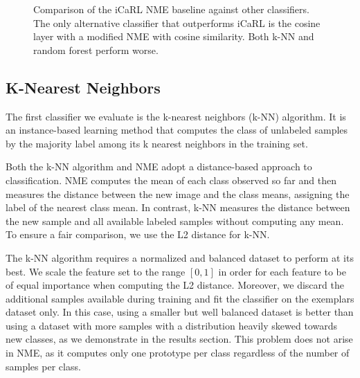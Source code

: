 \documentclass[10pt,twocolumn,letterpaper]{article}
\begin{document}
\begin{figure}
\caption{Comparison of the iCaRL NME baseline against other classifiers. The only alternative classifier that outperforms iCaRL is the cosine layer with a modified NME with cosine similarity. Both k-NN and random forest perform worse.}
\label{fig:classifier:plot}
\end{figure}

\subsection{K-Nearest Neighbors}
The first classifier we evaluate is the k-nearest neighbors (k-NN) algorithm. It is an instance-based learning method that computes the class of unlabeled samples by the majority label among its k nearest neighbors in the training set.

Both the k-NN algorithm and NME adopt a distance-based approach to classification. NME computes the mean of each class observed so far and then measures the distance between the new image and the class means, assigning the label of the nearest class mean. In contrast, k-NN measures the distance between the new sample and all available labeled samples without computing any mean. To ensure a fair comparison, we use the L2 distance for k-NN.

The k-NN algorithm requires a normalized and balanced dataset to perform at its best. We scale the feature set to the range $[0, 1]$ in order for each feature to be of equal importance when computing the L2 distance. Moreover, we discard the additional samples available during training and fit the classifier on the exemplars dataset only. In this case, using a smaller but well balanced dataset is better than using a dataset with more samples with a distribution heavily skewed towards new classes, as we demonstrate in the results section. This problem does not arise in NME, as it computes only one prototype per class regardless of the number of samples per class.
\end{document}
